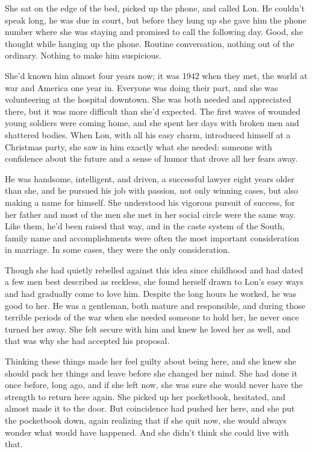 \documentclass[10pt, twoside, openright]{book}
\begin{document}
She sat on the edge of the bed, picked up the phone, and called Lon. He
couldn't speak long, he was due in court, but before they hung up she
gave him the phone number where she was staying and promised to call the
following day. Good, she thought while hanging up the phone. Routine
conversation, nothing out of the ordinary. Nothing to make him
suspicious.

She'd known him almost four years now; it was 1942 when they met, the
world at war and America one year in. Everyone was doing their part, and
she was volunteering at the hospital downtown. She was both needed and
appreciated there, but it was more difficult than she'd expected. The
first waves of wounded young soldiers were coming home, and she spent
her days with broken men and shattered bodies. When Lon, with all his
easy charm, introduced himself at a Christmas party, she saw in him
exactly what she needed: someone with confidence about the future and a
sense of humor that drove all her fears away.

He was handsome, intelligent, and driven, a successful law\-yer eight
years older than she, and he pursued his job with passion, not only
winning cases, but also making a name for himself. She understood his
vigorous pursuit of success, for her father and most of the men she met
in her social circle were the same way. Like them, he'd been raised that
way, and in the caste system of the South, family name and
accomplishments were often the most important consideration in marriage.
In some cases, they were the only consideration.

Though she had quietly rebelled against this idea since childhood and
had dated a few men best described as reckless, she found herself drawn
to Lon's easy ways and had gradually come to love him. Despite the long
hours he worked, he was good to her. He was a gentleman, both mature and
responsible, and during those terrible periods of the war when she
needed someone to hold her, he never once turned her away. She felt
secure with him and knew he loved her as well, and that was why she had
accepted his proposal.

Thinking these things made her feel guilty about being here, and she
knew she should pack her things and leave before she changed her mind.
She had done it once before, long ago, and if she left now, she was sure
she would never have the strength to return here again. She picked up
her pocketbook, hesitated, and almost made it to the door. But
coincidence had pushed her here, and she put the pocketbook down, again
realizing that if she quit now, she would always wonder what would have
happened. And she didn't think she could live with that.
\end{document}
